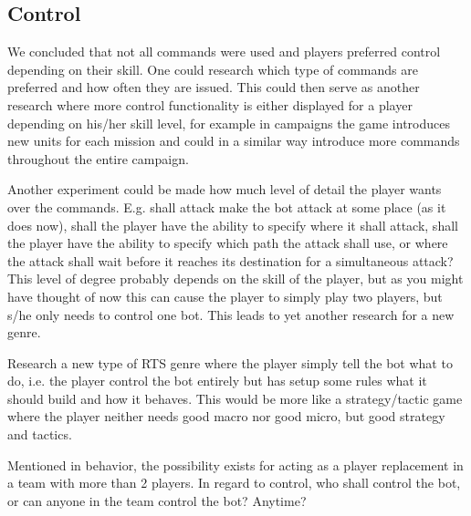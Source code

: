 \subsection{Control}
\label{sec:future_control}
We concluded that not all commands were used and players preferred control depending on their skill.
One could research which type of commands are preferred and how often they are issued. This could
then serve as another research where more control functionality is either displayed for a player
depending on his/her skill level, for example in campaigns the game introduces new units for each
mission and could in a similar way introduce more commands throughout the entire campaign.

Another experiment could be made how much level of detail the player wants over the commands. E.g.
shall attack make the bot attack at some place (as it does now), shall the player have the ability
to specify where it shall attack, shall the player have the ability to specify which path the attack
shall use, or where the attack shall wait before it reaches its destination for a simultaneous
attack?  This level of degree probably depends on the skill of the player, but as you might have
thought of now this can cause the player to simply play two players, but s/he only needs to control
one bot. This leads to yet another research for a new genre.

Research a new type of RTS genre where the player simply tell the bot what to do, i.e. the player
control the bot entirely but has setup some rules what it should build and how it behaves. This
would be more like a strategy/tactic game where the player neither needs good macro nor good micro, but
good strategy and tactics.

Mentioned in behavior, the possibility exists for acting as a player replacement in a team with more
than 2 players. In regard to control, who shall control the bot, or can anyone in the team control
the bot? Anytime?
